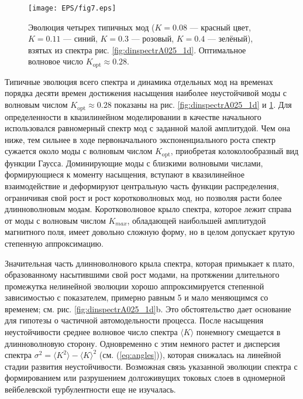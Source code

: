 \begin{figure}[t]
\centering
\texttt{[image: EPS/fig7.eps]}
\caption{Эволюция четырех типичных мод ($K=0.08$ --- красный цвет, $K=0.11$ --- синий, $K=0.3$ --- розовый, $K=0.4$ --- зелёный), взятых из спектра рис. \ref{fig:dinspectrA025_1d}. Оптимальное волновое число $K_\mathrm{opt}\approx0.28$.}
\label{fig:evol_garmA025_1d}
\end{figure}

Типичные эволюция всего спектра и динамика отдельных мод на временах порядка десяти времен достижения насыщения наиболее неустойчивой моды с волновым числом $K_\mathrm{opt}\approx0.28$ показаны на рис. \ref{fig:dinspectrA025_1d} и \ref{fig:evol_garmA025_1d}. Для определенности в квазилинейном моделировании в качестве начального использовался равномерный спектр мод с заданной малой амплитудой. Чем она ниже, тем сильнее в ходе первоначального экспоненциального роста спектр сужается около моды с волновым числом $K_\mathrm{opt}$, приобретая колоколообразный вид функции Гаусса. Доминирующие моды с близкими волновыми числами, формирующиеся к моменту насыщения, вступают в квазилинейное взаимодействие и деформируют центральную часть функции распределения, ограничивая свой рост и рост коротковолновых мод, но позволяя расти более длинноволновым модам. Коротковолновое крыло спектра, которое лежит справа от моды с волновым числом $K_{max}$, обладающей наибольшей амплитудой магнитного поля, имеет довольно сложную форму, но в целом допускает крутую степенную аппроксимацию.

Значительная часть длинноволнового крыла спектра, которая примыкает к плато, образованному насытившими свой рост модами, на протяжении длительного промежутка нелинейной эволюции хорошо аппроксимируется степенной зависимостью с показателем, примерно равным 5 и мало меняющимся со временем; см. рис. \ref{fig:dinspectrA025_1d}b. Это обстоятельство дает основание для гипотезы о частичной автомодельности процесса. После насыщения неустойчивости среднее волновое число спектра $\langle K\rangle$ понемногу смещается в длинноволновую сторону. Одновременно с этим немного растет и дисперсия спектра $\sigma^2=\langle K^2\rangle-\langle K\rangle^2$ (см. (\ref{eq:angles})), которая снижалась на линейной стадии развития неустойчивости. Возможная связь указанной эволюции спектра с формированием или разрушением долгоживущих токовых слоев в одномерной вейбелевской турбулентности еще не изучалась.

